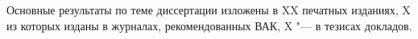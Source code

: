      Основные результаты по теме диссертации изложены в XX печатных изданиях, 
    X из которых изданы в журналах, рекомендованных ВАК, 
    X "--- в тезисах докладов.%
    

